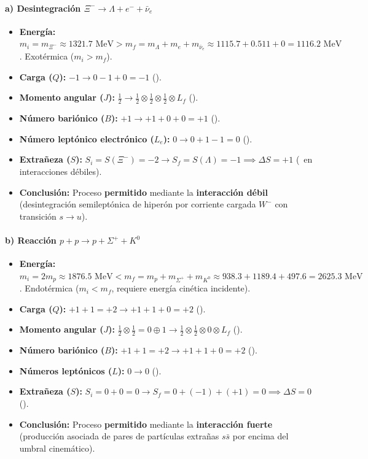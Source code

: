 \begin{problema}
\paragraph{a) Desintegración $\Xi^- \to \Lambda + e^- + \bar{\nu}_e$}
\begin{itemize}
    \item \textbf{Energía:} $m_i = m_{\Xi^-} \approx 1321.7\text{ MeV} > m_f = m_\Lambda + m_e + m_{\bar{\nu}_e} \approx 1115.7 + 0.511 + 0 = 1116.2\text{ MeV}$. Exotérmica ($m_i > m_f$).
    \item \textbf{Carga ($Q$):} $-1 \to 0 - 1 + 0 = -1$ (\checkmark).
    \item \textbf{Momento angular ($J$):} $\frac{1}{2} \to \frac{1}{2} \otimes \frac{1}{2} \otimes \frac{1}{2} \otimes L_f$ (\checkmark).
    \item \textbf{Número bariónico ($B$):} $+1 \to +1 + 0 + 0 = +1$ (\checkmark).
    \item \textbf{Número leptónico electrónico ($L_e$):} $0 \to 0 + 1 - 1 = 0$ (\checkmark).
    \item \textbf{Extrañeza ($S$):} $S_i = S(\Xi^-) = -2 \to S_f = S(\Lambda) = -1 \implies \Delta S = +1$ (\checkmark\, en interacciones débiles).
    \item \textbf{Conclusión:} Proceso \textbf{permitido} mediante la \textbf{interacción débil} (desintegración semileptónica de hiperón por corriente cargada $W^-$ con transición $s \to u$).
\end{itemize}

\paragraph{b) Reacción $p + p \to p + \Sigma^+ + K^0$}
\begin{itemize}
    \item \textbf{Energía:} $m_i = 2 m_p \approx 1876.5\text{ MeV} < m_f = m_p + m_{\Sigma^+} + m_{K^0} \approx 938.3 + 1189.4 + 497.6 = 2625.3\text{ MeV}$. Endotérmica ($m_i < m_f$, requiere energía cinética incidente).
    \item \textbf{Carga ($Q$):} $+1 + 1 = +2 \to +1 + 1 + 0 = +2$ (\checkmark).
    \item \textbf{Momento angular ($J$):} $\frac{1}{2} \otimes \frac{1}{2} = 0 \oplus 1 \to \frac{1}{2} \otimes \frac{1}{2} \otimes 0 \otimes L_f$ (\checkmark).
    \item \textbf{Número bariónico ($B$):} $+1 + 1 = +2 \to +1 + 1 + 0 = +2$ (\checkmark).
    \item \textbf{Números leptónicos ($L$):} $0 \to 0$ (\checkmark).
    \item \textbf{Extrañeza ($S$):} $S_i = 0 + 0 = 0 \to S_f = 0 + (-1) + (+1) = 0 \implies \Delta S = 0$ (\checkmark).
    \item \textbf{Conclusión:} Proceso \textbf{permitido} mediante la \textbf{interacción fuerte} (producción asociada de pares de partículas extrañas $s\bar{s}$ por encima del umbral cinemático).
\end{itemize}


\end{problema}
